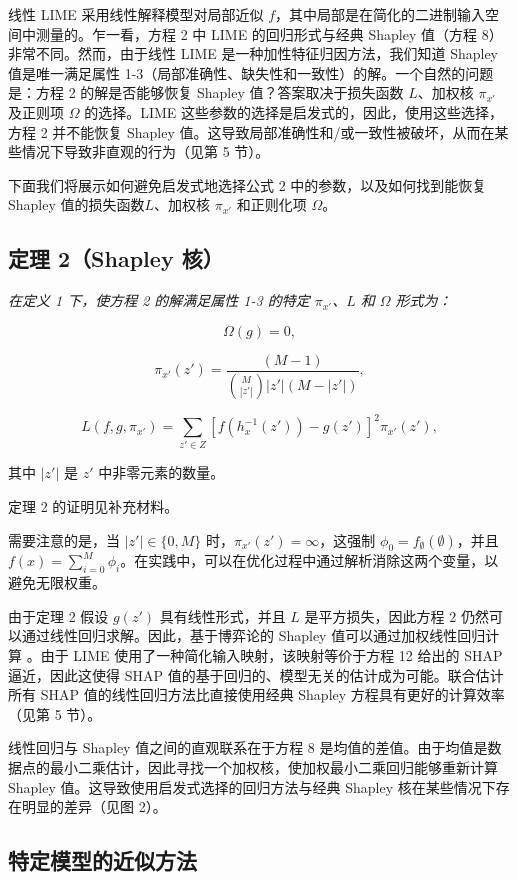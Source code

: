 \documentclass[12pt, a4paper]{ctexart} %
\begin{document}
线性 LIME 采用线性解释模型对局部近似 $f$，其中局部是在简化的二进制输入空间中测量的。乍一看，方程 2 中 LIME 的回归形式与经典 Shapley 值（方程 8）非常不同。然而，由于线性 LIME 是一种加性特征归因方法，我们知道 Shapley 值是唯一满足属性 1-3（局部准确性、缺失性和一致性）的解。一个自然的问题是：方程 2 的解是否能够恢复 Shapley 值？答案取决于损失函数 $L$、加权核 $\pi_{x'}$ 及正则项 $\Omega$ 的选择。LIME 这些参数的选择是启发式的，因此，使用这些选择，方程 2 并不能恢复 Shapley 值。这导致局部准确性和/或一致性被破坏，从而在某些情况下导致非直观的行为（见第 5 节）。

下面我们将展示如何避免启发式地选择公式 2 中的参数，以及如何找到能恢复 Shapley 值的损失函数$ L$、加权核 $\pi_{x'}$ 和正则化项 $\Omega$。
\subsection*{定理 2（Shapley 核）}

\textit{在定义 1 下，使方程 2 的解满足属性 1-3 的特定 $\pi_{x'}$、$L$ 和 $\Omega$ 形式为：}

\[
\Omega(g) = 0,
\]

\[
\pi_{x'}(z') = \frac{(M - 1)}{\binom{M}{|z'|} |z'| (M - |z'|)},
\]

\[
L(f, g, \pi_{x'}) = \sum_{z' \in Z} \left[ f(h_x^{-1}(z')) - g(z') \right]^2 \pi_{x'}(z'),
\]

其中 $|z'|$ 是 $z'$ 中非零元素的数量。

定理 2 的证明见补充材料。

需要注意的是，当 $|z'| \in \{0, M\}$ 时，$\pi_{x'}(z') = \infty$，这强制 $\phi_0 = f_{\emptyset}(\emptyset)$，并且 $f(x) = \sum_{i=0}^{M} \phi_i$。在实践中，可以在优化过程中通过解析消除这两个变量，以避免无限权重。

由于定理 2 假设 $g(z')$ 具有线性形式，并且 $L$ 是平方损失，因此方程 2 仍然可以通过线性回归求解。因此，基于博弈论的 Shapley 值可以通过加权线性回归计算 \cite{shapley_regression}。由于 LIME 使用了一种简化输入映射，该映射等价于方程 12 给出的 SHAP 逼近，因此这使得 SHAP 值的基于回归的、模型无关的估计成为可能。联合估计所有 SHAP 值的线性回归方法比直接使用经典 Shapley 方程具有更好的计算效率（见第 5 节）。

线性回归与 Shapley 值之间的直观联系在于方程 8 是均值的差值。由于均值是数据点的最小二乘估计，因此寻找一个加权核，使加权最小二乘回归能够重新计算 Shapley 值。这导致使用启发式选择的回归方法与经典 Shapley 核在某些情况下存在明显的差异（见图 2）。

\subsection{特定模型的近似方法}
\end{document}

